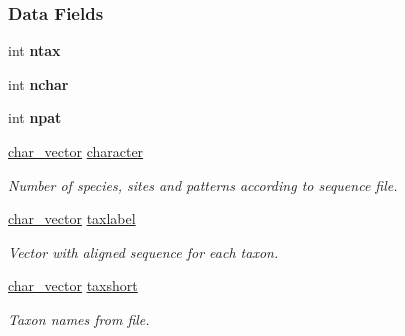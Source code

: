 \subsubsection*{Data Fields}
\begin{DoxyCompactItemize}
\item 
\mbox{\label{structalignment__struct_a90c549537ebcaeadf99cc214d9dbc8a6}} 
int {\bfseries ntax}
\item 
\mbox{\label{structalignment__struct_a6586911ceefd68b40afb55f9c1f8cb37}} 
int {\bfseries nchar}
\item 
\mbox{\label{structalignment__struct_acae069aef1bf83529417d5503520dd20}} 
int {\bfseries npat}
\item 
\mbox{\label{structalignment__struct_a5f298db9c22602b033f76d8e08469f0f}} 
\hyperlink{structchar__vector__struct}{char\+\_\+vector} \hyperlink{structalignment__struct_a5f298db9c22602b033f76d8e08469f0f}{character}
\begin{DoxyCompactList}\small\item\em Number of species, sites and patterns according to sequence file. \end{DoxyCompactList}\item 
\mbox{\label{structalignment__struct_ad0f1532a0b09d3987e99c51dd47b9415}} 
\hyperlink{structchar__vector__struct}{char\+\_\+vector} \hyperlink{structalignment__struct_ad0f1532a0b09d3987e99c51dd47b9415}{taxlabel}
\begin{DoxyCompactList}\small\item\em Vector with aligned sequence for each taxon. \end{DoxyCompactList}\item 
\mbox{\label{structalignment__struct_a193cea40877f33ff676015ed1d1cc876}} 
\hyperlink{structchar__vector__struct}{char\+\_\+vector} \hyperlink{structalignment__struct_a193cea40877f33ff676015ed1d1cc876}{taxshort}
\begin{DoxyCompactList}\small\item\em Taxon names from file. \end{DoxyCompactList}\item 

\end{DoxyCompactItemize}
